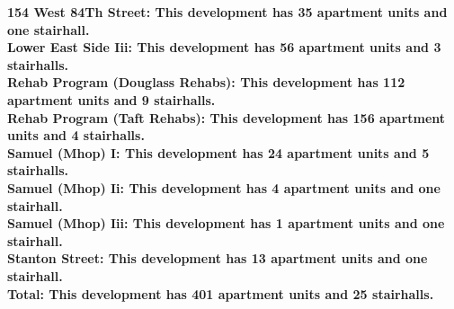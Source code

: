 \bf{154 West 84Th Street}: This development has 35 apartment units and one stairhall.\\\bf{Lower East Side Iii}: This development has 56 apartment units and 3 stairhalls.\\\bf{Rehab Program (Douglass Rehabs)}: This development has 112 apartment units and 9 stairhalls.\\\bf{Rehab Program (Taft Rehabs)}: This development has 156 apartment units and 4 stairhalls.\\\bf{Samuel (Mhop) I}: This development has 24 apartment units and 5 stairhalls.\\\bf{Samuel (Mhop) Ii}: This development has 4 apartment units and one stairhall.\\\bf{Samuel (Mhop) Iii}: This development has 1 apartment units and one stairhall.\\\bf{Stanton Street}: This development has 13 apartment units and one stairhall.\\\bf{Total}: This development has 401 apartment units and 25 stairhalls.\\